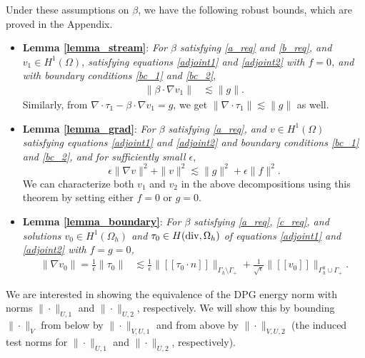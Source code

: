 \documentclass[11pt,onecolumn]{scrartcl}
\newcommand{\LRs}[1]{\left[ #1 \right]}
\newcommand{\jump}[1] {\ensuremath{\LRs{\![#1]\!}}}
\newcommand{\Gh}{\Gamma_h}
\newcommand{\Oh}{\Omega_h}
\newcommand{\grad}{\nabla}
\renewcommand{\div}{\grad \cdot}
\begin{document}
Under these assumptions on $\beta$, we have the following robust bounds, which are proved in the Appendix. 
\begin{itemize}
\item \textbf{Lemma \ref{lemma_stream}}: \textit{For $\beta$ satisfying \eqref{a_req} and \eqref{b_req}, %
and $v_1 \in H^1(\Omega)$, satisfying equations \eqref{adjoint1} and \eqref{adjoint2} with $f=0$, and with boundary conditions \eqref{bc_1} and \eqref{bc_2}},
\begin{align*}
\|\beta \cdot \grad v_1 \| &\lesssim \| g\|.
\end{align*}
Similarly, from $\div \tau_1 - \beta\cdot \grad v_1 = g$, we get $\|\div \tau_1\| \lesssim \|g\|$ as well.  
\item \textbf{Lemma \ref{lemma_grad}}: \textit{For $\beta$ satisfying \eqref{a_req}, and $v \in H^1(\Omega)$ satisfying equations \eqref{adjoint1} and \eqref{adjoint2} and boundary conditions \eqref{bc_1} and \eqref{bc_2}, and for sufficiently small $\epsilon$},
\[
\epsilon \|\grad v\|^2 + \|v\|^2 \lesssim \|g\|^2 + \epsilon \|f\|^2.
\]
We can characterize both $v_1$ and $v_2$ in the above decompositions using this theorem by setting either $f=0$ or $g=0$. 
\item \textbf{Lemma \ref{lemma_boundary}}: \textit{For $\beta$ satisfying \eqref{a_req}, \eqref{c_req}, and solutions $v_0 \in H^1(\Oh)$ and $\tau_0 \in H({\rm div},\Oh)$ of equations \eqref{adjoint1} and \eqref{adjoint2} with $f=g=0$,} 
\begin{align*}
\|\grad v_0\| = \frac{1}{\epsilon}\|\tau_0\| &\lesssim \frac{1}{\epsilon} \| \jump{\tau_0\cdot n}\|_{\Gh \setminus \Gamma_+} + \frac{1}{\sqrt{\epsilon}} \| \jump{v_0}\|_{\Gh^0 \cup \Gamma_+}.
\end{align*}
\end{itemize}
We are interested in showing the equivalence of the DPG energy norm with norms $\|\cdot\|_{U,1}$ and $\|\cdot\|_{U,2}$, respectively.  We will show this by bounding $\|\cdot \|_V$ from below by $\|\cdot\|_{V,U,1}$ and from above by $\|\cdot\|_{V,U,2}$ (the induced test norms for $\|\cdot\|_{U,1}$ and $\|\cdot\|_{U,2}$, respectively).  
\end{document}
